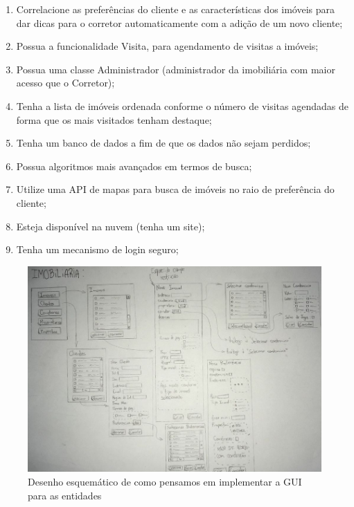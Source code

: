 \documentclass[a4paper,11pt,fleqn]{article}
\begin{document}
\begin{enumerate}
    \item Correlacione as preferências do cliente e as características dos imóveis para dar dicas para o corretor automaticamente com a adição de um novo cliente;
    \item Possua a funcionalidade Visita, para agendamento de visitas a imóveis;
    \item Possua uma classe Administrador (administrador da imobiliária com maior acesso que o Corretor);
    \item Tenha a lista de imóveis ordenada conforme o número de visitas agendadas de forma que os mais visitados tenham destaque;
    \item Tenha um banco de dados a fim de que os dados não sejam perdidos;
    \item Possua algoritmos mais avançados em termos de busca;
    \item Utilize uma API de mapas para busca de imóveis no raio de preferência do cliente;
    \item Esteja disponível na nuvem (tenha um site);
    \item Tenha um mecanismo de login seguro;
\end{enumerate}

\begin{figure}[h!]
  \begin{center}
    \includegraphics[scale=0.35]{imagens/interface-grafica.png}
  \end{center}
  \caption{Desenho esquemático de como pensamos em implementar a GUI para as entidades}
  \label{f:trello}
\end{figure}
\end{document}

